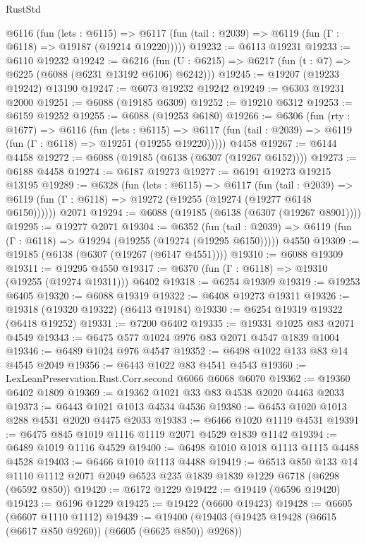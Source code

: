 \begin{lexlean}{RustStd}
\begin{coremodule}
    @6116
      (fun (lets : @6115) =>
      @6117 (fun (tail : @2039) => @6119 (fun (Γ : @6118) => @19187 (@19214 @19220)))))
@19232 := @6113 @19231
@19233 := @6110 @19232
@19242 := @6216
    (fun (U : @6215) => @6217 (fun (t : @7) => @6225 (@6088 (@6231 @13192 @6106) @6242)))
@19245 := @19207 (@19233 @19242) @13190
@19247 := @6073 @19232 @19242
@19249 := @6303 @19231 @2000
@19251 := @6088 (@19185 @6309)
@19252 := @19210 @6312
@19253 := @6159 @19252
@19255 := @6088 (@19253 @6180)
@19266 := @6306
    (fun (rty : @1677) =>
    @6116
      (fun (lets : @6115) =>
      @6117 (fun (tail : @2039) => @6119 (fun (Γ : @6118) => @19251 (@19255 @19220)))))
    @4458
@19267 := @6144 @4458
@19272 := @6088 (@19185 (@6138 (@6307 (@19267 @6152))))
@19273 := @6188 @4458
@19274 := @6187 @19273
@19277 := @6191 @19273 @19215 @13195
@19289 := @6328
    (fun (lets : @6115) =>
    @6117
      (fun (tail : @2039) =>
      @6119 (fun (Γ : @6118) => @19272 (@19255 (@19274 (@19277 @6148 @6150))))))
    @2071
@19294 := @6088 (@19185 (@6138 (@6307 (@19267 @8901))))
@19295 := @19277 @2071
@19304 := @6352
    (fun (tail : @2039) => @6119 (fun (Γ : @6118) => @19294 (@19255 (@19274 (@19295 @6150)))))
    @4550
@19309 := @19185 (@6138 (@6307 (@19267 (@6147 @4551))))
@19310 := @6088 @19309
@19311 := @19295 @4550
@19317 := @6370 (fun (Γ : @6118) => @19310 (@19255 (@19274 @19311))) @6402
@19318 := @6254 @19309
@19319 := @19253 @6405
@19320 := @6088 @19319
@19322 := @6408 @19273 @19311
@19326 := @19318 (@19320 @19322) (@6413 @19184)
@19330 := @6254 @19319 @19322 (@6418 @19252)
@19331 := @7200 @6402
@19335 := @19331 @1025 @83 @2071 @4549
@19343 := @6475 @577 @1024 @976 @83 @2071 @4547 @1839 @1004
@19346 := @6489 @1024 @976 @4547
@19352 := @6498 @1022 @133 @83 @14 @4545 @2049
@19356 := @6443 @1022 @83 @4541 @4543
@19360 := LexLeanPreservation.Rust.Corr.second @6066 @6068 @6070
@19362 := @19360 @6402 @1809
@19369 := @19362 @1021 @33 @83 @4538 @2020 @4463 @2033
@19373 := @6443 @1021 @1013 @4534 @4536
@19380 := @6453 @1020 @1013 @288 @4531 @2020 @4475 @2033
@19383 := @6466 @1020 @1119 @4531
@19391 := @6475 @845 @1019 @1116 @1119 @2071 @4529 @1839 @1142
@19394 := @6489 @1019 @1116 @4529
@19400 := @6498 @1010 @1018 @1113 @1115 @4488 @4528
@19403 := @6466 @1010 @1113 @4488
@19419 := @6513
    @850
    @133
    @14
    @1110
    @1112
    @2071
    @2049
    @6523
    @235
    @1839
    @1839
    @1229
    @6718
    (@6298 (@6592 @850))
@19420 := @6172 @1229
@19422 := @19419 (@6596 @19420)
@19423 := @6196 @1229
@19425 := @19422 (@6600 @19423)
@19428 := @6605 (@6607 @1110 @1112)
@19439 := @19400 (@19403 (@19425 @19428 (@6615 (@6617 @850 @9260)) (@6605 (@6625 @850)) @9268))

\end{coremodule}
\end{lexlean}
